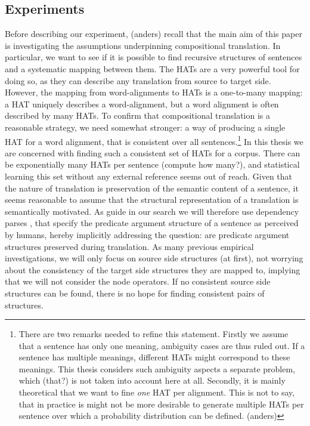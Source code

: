 \documentclass{report}
\theoremstyle{definition}
\theoremstyle{plain}
\begin{document}
\subsection{Experiments}

Before describing our experiment, (anders) recall that the main aim of this paper is investigating the assumptions underpinning compositional translation. In particular, we want to see if it is possible to find recursive structures of sentences and a systematic mapping between them. The HATs are a very powerful tool for doing so, as they can describe any translation from source to target side. However, the mapping from word-alignments to HATs is a one-to-many mapping: a HAT uniquely describes a word-alignment, but a word alignment is often described by many HATs. To confirm that compositional translation is a reasonable strategy, we need somewhat stronger: a way of producing a single HAT for a word alignment, that is consistent over all sentences.\footnote{There are two remarks needed to refine this statement. Firstly we assume that a sentence has only one meaning, ambiguity cases are thus ruled out. If a sentence has multiple meanings, different HATs might correspond to these meanings. This thesis considers such ambiguity aspects a separate problem, which (that?) is not taken into account here at all. Secondly, it is mainly theoretical that we want to fine \textit{one} HAT per alignment. This is not to say, that in practice is might not be more desirable to generate multiple HATs per sentence over which a probability distribution can be defined. (anders)} In this thesis we are concerned with finding such a consistent set of HATs for a corpus. There can be exponentially many HATs per sentence (compute how many?), and statistical learning this set without any external reference seems out of reach. Given that the nature of translation is preservation of the semantic content of a sentence, it seems reasonable to assume that the structural representation of a translation is semantically motivated. As guide in our search we will therefore use dependency parses \citep{schubert1987metataxis}, that specify the predicate argument structure of a sentence as perceived by humans, hereby implicitly addressing the question: are predicate argument structures preserved during translation. As many previous empirical investigations, we will only focus on source side structures (at first), not worrying about the consistency of the target side structures they are mapped to, implying that we will not consider the node operators. If no consistent source side structures can be found, there is no hope for finding consistent pairs of structures.
\end{document}
